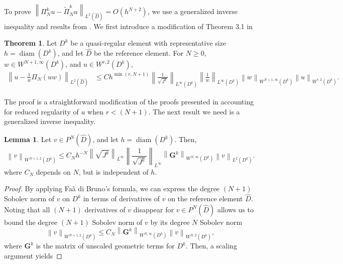 \documentclass[preprint,10pt]{article}
\theoremstyle{definition}
\theoremstyle{lemma}
\newtheorem{lemma}{Lemma}
\theoremstyle{theorem}
\newtheorem{theorem}{Theorem}
\theoremstyle{assumption}
\DeclareMathOperator{\diam}{diam}
\renewcommand{\hat}{\widehat}
\renewcommand{\tilde}{\widetilde}
\newcommand{\nor}[1]{\left\| #1 \right\|}
\newcommand{\LRp}[1]{\left( #1 \right)}
\begin{document}
{To prove $\nor{\Pi_N^k u - \tilde{\Pi}^k_N  u}_{L^2\LRp{\hat{D}}} = O(h^{N+2})$, we use a generalized inverse inequality and results from \cite{chan2016weight1,chan2016weight2}.  We first introduce a modification of Theorem 3.1 in \cite{warburton2013low, chan2016weight1}
\begin{theorem}%
Let $D^k$ be a quasi-regular element with representative size $h = \diam\LRp{D^k}$, and let $\hat{D}$ be the reference element.  For $N \geq 0$, $w\in W^{N+1,\infty}\LRp{D^k}$, and $u\in W^{r,2}\LRp{D^k}$, 
\begin{align*}
\nor{u - \frac{1}{w} \Pi_N\LRp{{u}{w}}}_{L^2\LRp{\hat{D}}} &\leq C h^{\min\LRp{r,N+1}} \nor{\frac{1}{\sqrt{J^k}}}_{L^{\infty}\LRp{D^k}}\nor{\frac{1}{w}}_{L^{\infty}\LRp{D^k}} \nor{w}_{W^{N+1,\infty}\LRp{D^k}} \nor{u}_{W^{r,2}\LRp{D^k}}.
\end{align*}
\label{thm:wproj}
\end{theorem}
The proof is a straightforward modification of the proofs presented in \cite{warburton2013low, chan2016weight1} accounting for reduced regularity of $u$ when $r < (N+1)$.  The next result we need is a generalized inverse inequality.  
\begin{lemma}
\label{lemma:sobolev}
Let $v \in P^N\LRp{\hat{D}}$, and let $h = \diam\LRp{D^k}$.  Then,
\[
\nor{v}_{W^{N+1,2}\LRp{D^k}} \leq C_{N}  h^{-N} \nor{\sqrt{J^k}}_{L^{\infty}} \nor{\frac{1}{\sqrt{J^k}}}_{L^{\infty}} \nor{\bm{G}^k}_{W^{N,\infty}\LRp{D^k}} \nor{v}_{L^2\LRp{D^k}}.
\]
where $C_{N}$ depends on $N$, but is independent of $h$.
\end{lemma}
\begin{proof}
  By applying Fa\`{a} di Bruno's formula, we can express the degree $(N+1)$ Sobolev norm of $v$ on $D^k$ in terms of derivatives of $v$ on the reference element $\hat{D}$.  Noting that all $(N+1)$ derivatives of $v$ disappear for $v\in P^N\LRp{\hat{D}}$ allows us to bound the degree $(N+1)$ Sobolev norm of $v$ by its degree $N$ Sobolev norm
\[
\nor{v}_{W^{N+1,2}\LRp{D^k}} \leq C_N \nor{\bm{G}^k}_{W^{N,\infty}\LRp{D^k}} \nor{v}_{W^{N,2}\LRp{D^k}},
\]
where $\bm{G}^k$ is the matrix of unscaled geometric terms for $D^k$.  Then, a scaling argument \cite{brenner2007mathematical} yields

\end{proof}}
\end{document}
